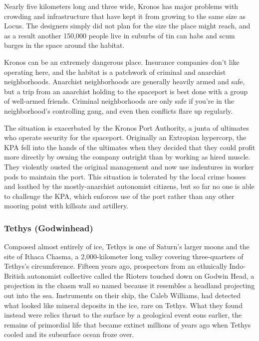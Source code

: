 Nearly five kilometers long and three wide, Kronos 
has major problems with crowding and infrastructure 
that have kept it from growing to the same size as 
Locus. The designers simply did not plan for the size 
the place might reach, and as a result another 150,000 
people live in suburbs of tin can habs and scum barges 
in the space around the habitat. 

Kronos can be an extremely dangerous place. 
Insurance companies don't like operating here, and 
the habitat is a patchwork of criminal and anarchist 
neighborhoods. Anarchist neighborhoods are generally 
heavily armed and safe, but a trip from an anarchist 
holding to the spaceport is best done with a group of 
well-armed friends. Criminal neighborhoods are only 
safe if you're in the neighborhood's controlling gang, 
and even then conflicts flare up regularly.

The situation is exacerbated by the Kronos Port 
Authority, a junta of ultimates who operate security 
for the spaceport. Originally an Extropian hypercorp, 
the KPA fell into the hands of the ultimates when 
they decided that they could profit more directly 
by owning the company outright than by working 
as hired muscle. They violently ousted the original 
management and now use indentures in worker pods 
to maintain the port. This situation is tolerated by 
the local crime bosses and loathed by the mostly-anarchist
autonomist citizens, but so far no one is
able to challenge the KPA, which enforces use of the 
port rather than any other mooring point with killsats
and artillery.

\subsubsection{Tethys (Godwinhead)}

Composed almost entirely of ice, Tethys is one of Saturn's
larger moons and the site of Ithaca Chasma, a
2,000-kilometer long valley covering three-quarters of 
Tethys's circumference. Fifteen years ago, prospectors 
from an ethnically Indo-British autonomist collective 
called the Rioters touched down on Godwin Head, a 
projection in the chasm wall so named because it resembles
a headland projecting out into the sea. Instruments
on their ship, the Caleb Williams, had detected
what looked like mineral deposits in the ice, rare on 
Tethys. What they found instead were relics thrust 
to the surface by a geological event eons earlier, the 
remains of primordial life that became extinct millions 
of years ago when Tethys cooled and its subsurface 
ocean froze over.

